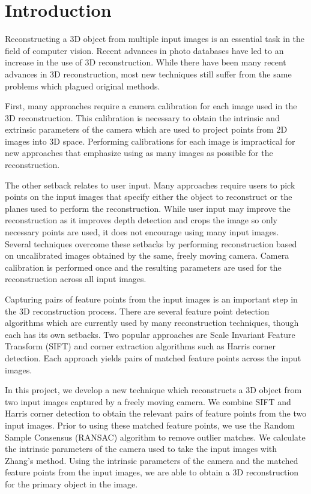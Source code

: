 \section{Introduction}
\label{s:intro}

Reconstructing a 3D object from multiple input images is an essential task in the field of computer vision. Recent advances in photo databases have led to an increase in the use of 3D reconstruction. While there have been many recent advances in 3D reconstruction, most new techniques still suffer from the same problems which plagued original methods. 

First, many approaches require a camera calibration for each image used in the 3D reconstruction. This calibration is necessary to obtain the intrinsic and extrinsic parameters of the camera which are used to project points from 2D images into 3D space. Performing calibrations for each image is impractical for new approaches that emphasize using as many images as possible for the reconstruction.

The other setback relates to user input. Many approaches require users to pick points on the input images that specify either the object to reconstruct or the planes used to perform the reconstruction. While user input may improve the reconstruction as it improves depth detection and crops the image so only necessary points are used, it does not encourage using many input images. Several techniques overcome these setbacks by performing reconstruction based on uncalibrated images obtained by the same, freely moving camera. Camera calibration is performed once and the resulting parameters are used for the reconstruction across all input images. 

Capturing pairs of feature points from the input images is an important step in the 3D reconstruction process. There are several feature point detection algorithms which are currently used by many reconstruction techniques, though each has its own setbacks. Two popular approaches are Scale Invariant Feature Transform (SIFT) and corner extraction algorithms such as Harris corner detection. Each approach yields pairs of matched feature points across the input images. 

In this project, we develop a new technique which reconstructs a 3D object from two input images captured by a freely moving camera. We combine SIFT and Harris corner detection to obtain the relevant pairs of feature points from the two input images. Prior to using these matched feature points, we use the Random Sample Consensus (RANSAC) algorithm to remove outlier matches. We calculate the intrinsic parameters of the camera used to take the input images with Zhang’s method. Using the intrinsic parameters of the camera and the matched feature points from the input images, we are able to obtain a 3D reconstruction for the primary object in the image.

